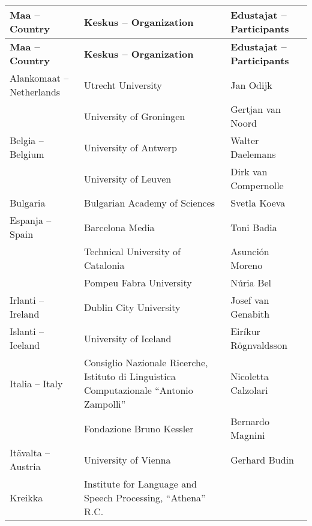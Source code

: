 \documentclass[]{../../metanetpaper}
\begin{document}
\begin{Parallel}[c]{77mm}{77mm}
\ParallelPar




\ParallelPar


\begin{longtable}{p{3.5cm}|p{5.5cm}|p{5cm}}
 \hline \textbf{Maa -- Country}
 & \textbf{Keskus -- Organization}
 & \textbf{Edustajat -- Participants}
 \\ \hline \endfirsthead
 \hline \textbf{Maa -- Country}
 & \raggedright \textbf{Keskus -- Organization}
 & \textbf{Edustajat -- Participants}
 \\ \hline \endhead
 Alankomaat -- Netherlands
 &  Utrecht University
 &  Jan Odijk
 \\
 &  University of Groningen
 &  Gertjan van Noord
 \\ \hline
 Belgia -- Belgium
 &  University of Antwerp
 &  Walter Daelemans
 \\
 &  University of Leuven
 &  Dirk van Compernolle
 \\ \hline
 Bulgaria
 &  Bulgarian Academy of Sciences
 &  Svetla Koeva
 \\ \hline
 Espanja -- Spain
 &  Barcelona Media
 &  Toni Badia
 \\
 &  Technical University of Catalonia
 &  Asunción Moreno
 \\
 &  Pompeu Fabra University
 &  Núria Bel
 \\ \hline
 Irlanti -- Ireland
 &  Dublin City University
 & Josef van Genabith
 \\ \hline
 Islanti -- Iceland
 &  University of Iceland
 &  Eiríkur Rögnvaldsson
 \\ \hline
 Italia -- Italy
 &  Consiglio Nazionale Ricerche,
    Istituto di Linguistica
    Computazionale “Antonio
    Zampolli”
 &  Nicoletta Calzolari
 \\
 &  Fondazione Bruno Kessler
 &  Bernardo Magnini
 \\ \hline
 Itävalta -- Austria
 &  University of Vienna
 &  Gerhard Budin
 \\ \hline
 Kreikka
 &  Institute for Language and        
    Speech Processing, “Athena” R.C.

\end{longtable}
\end{Parallel}
\end{document}
